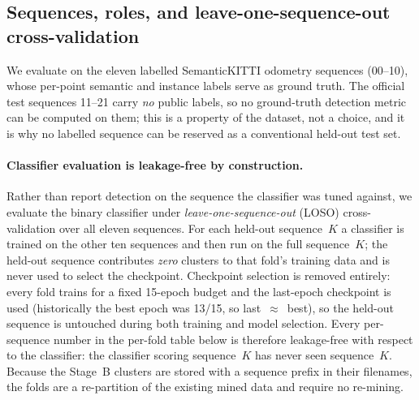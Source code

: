 \subsection{Sequences, roles, and leave-one-sequence-out cross-validation}
\label{sec:eval-sequences}

We evaluate on the eleven labelled SemanticKITTI odometry sequences
(\numrange{00}{10}), whose per-point semantic and instance labels serve as
ground truth. The official test sequences \numrange{11}{21} carry \emph{no}
public labels, so no ground-truth detection metric can be computed on them; this
is a property of the dataset, not a choice, and it is why no labelled sequence
can be reserved as a conventional held-out test set.

\paragraph{Classifier evaluation is leakage-free by construction.}
Rather than report detection on the sequence the classifier was tuned against, we
evaluate the binary classifier under \emph{leave-one-sequence-out} (LOSO)
cross-validation over all eleven sequences. For each held-out sequence~$K$ a
classifier is trained on the other ten sequences and then run on the full
sequence~$K$; the held-out sequence contributes \emph{zero} clusters to that
fold's training data and is never used to select the checkpoint. Checkpoint
selection is removed entirely: every fold trains for a fixed \num{15}-epoch
budget and the last-epoch checkpoint is used (historically the best epoch was
\num{13}/\num{15}, so last~$\approx$~best), so the held-out sequence is untouched
during both training and model selection. Every per-sequence number in the
per-fold table below is therefore leakage-free with respect to the classifier:
the classifier scoring sequence~$K$ has never seen sequence~$K$. Because the
Stage~B clusters are stored with a sequence prefix in their filenames, the folds
are a re-partition of the existing mined data and require no re-mining.

